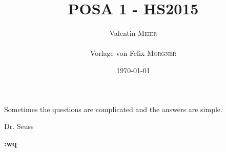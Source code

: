 \documentclass{report}
\title{POSA 1 - HS2015}
\author{Valentin \textsc{Meier}\\\\Vorlage von Felix \textsc{Morgner}}
\date{\today}
\begin{document}
\maketitle
\clearpage
\vspace*{\fill}
  \epigraph{Sometimes the questions are complicated and the answers are simple.}{Dr. Seuss}
\vfill
\clearpage

\setcounter{tocdepth}{0}
\tableofcontents



\clearpage
\vspace*{\fill}
\begin{center}
    { \huge \bfseries :wq }
\end{center}
\vfill
\clearpage
\end{document}
